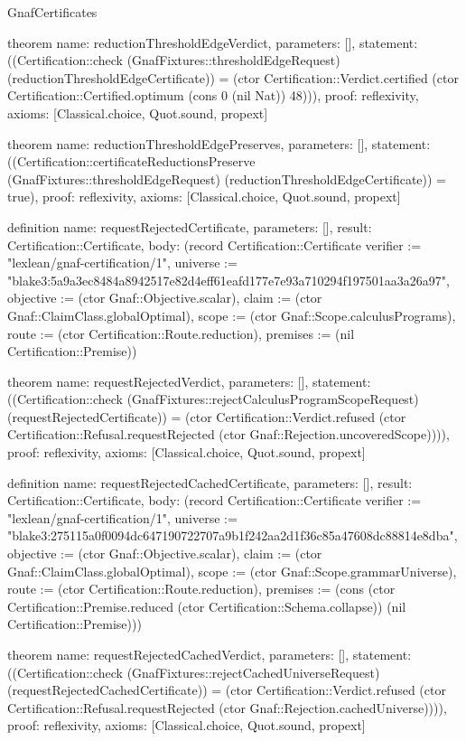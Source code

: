 \begin{lexlean}{GnafCertificates}
\begin{semanticmodule}
theorem{
  name: reductionThresholdEdgeVerdict,
  parameters: [],
  statement: ((Certification::check (GnafFixtures::thresholdEdgeRequest) (reductionThresholdEdgeCertificate)) = (ctor Certification::Verdict.certified (ctor Certification::Certified.optimum (cons 0 (nil Nat)) 48))),
  proof: reflexivity{},
  axioms: [Classical.choice, Quot.sound, propext]
}

theorem{
  name: reductionThresholdEdgePreserves,
  parameters: [],
  statement: ((Certification::certificateReductionsPreserve (GnafFixtures::thresholdEdgeRequest) (reductionThresholdEdgeCertificate)) = true),
  proof: reflexivity{},
  axioms: [Classical.choice, Quot.sound, propext]
}

definition{
  name: requestRejectedCertificate,
  parameters: [],
  result: Certification::Certificate,
  body: (record Certification::Certificate {verifier := "lexlean/gnaf-certification/1", universe := "blake3:5a9a3ec8484a8942517e82d4eff61eafd177e7e93a710294f197501aa3a26a97", objective := (ctor Gnaf::Objective.scalar), claim := (ctor Gnaf::ClaimClass.globalOptimal), scope := (ctor Gnaf::Scope.calculusPrograms), route := (ctor Certification::Route.reduction), premises := (nil Certification::Premise)})
}

theorem{
  name: requestRejectedVerdict,
  parameters: [],
  statement: ((Certification::check (GnafFixtures::rejectCalculusProgramScopeRequest) (requestRejectedCertificate)) = (ctor Certification::Verdict.refused (ctor Certification::Refusal.requestRejected (ctor Gnaf::Rejection.uncoveredScope)))),
  proof: reflexivity{},
  axioms: [Classical.choice, Quot.sound, propext]
}

definition{
  name: requestRejectedCachedCertificate,
  parameters: [],
  result: Certification::Certificate,
  body: (record Certification::Certificate {verifier := "lexlean/gnaf-certification/1", universe := "blake3:275115a0f0094dc647190722707a9b1f242aa2d1f36c85a47608dc88814e8dba", objective := (ctor Gnaf::Objective.scalar), claim := (ctor Gnaf::ClaimClass.globalOptimal), scope := (ctor Gnaf::Scope.grammarUniverse), route := (ctor Certification::Route.reduction), premises := (cons (ctor Certification::Premise.reduced (ctor Certification::Schema.collapse)) (nil Certification::Premise))})
}

theorem{
  name: requestRejectedCachedVerdict,
  parameters: [],
  statement: ((Certification::check (GnafFixtures::rejectCachedUniverseRequest) (requestRejectedCachedCertificate)) = (ctor Certification::Verdict.refused (ctor Certification::Refusal.requestRejected (ctor Gnaf::Rejection.cachedUniverse)))),
  proof: reflexivity{},
  axioms: [Classical.choice, Quot.sound, propext]
}


\end{semanticmodule}
\end{lexlean}

